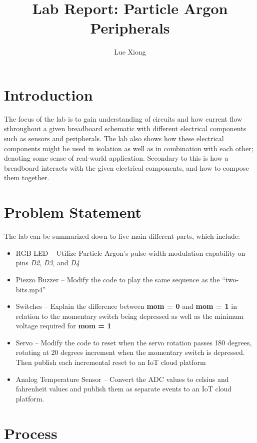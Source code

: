 \documentclass{article}
\title{Lab Report: Particle Argon Peripherals}
\author{Lue Xiong}
\begin{document}
\maketitle
\newpage
\obeylines

\section{Introduction}
The focus of the lab is to gain understanding of circuits and how current flow sthroughout a given breadboard schematic with different electrical components such as sensors and peripherals. The lab also shows how these electrical components might be used in isolation as well as in combination with each other; denoting some sense of real-world application. Secondary to this is how a breadboard interacts with the given electrical components, and how to compose them together.

\section{Problem Statement}
The lab can be summarized down to five main different parts, which include:

\begin{itemize}
\item RGB LED -- Utilize Particle Argon's pulse-width modulation capability on pins \textit{D2}, \textit{D3}, and \textit{D4}
\item Piezzo Buzzer -- Modify the code to play the same sequence as the “two-bits.mp4”
\item Switches -- Explain the difference between \textbf{mom = 0} and \textbf{mom = 1} in relation to the momentary switch being depressed as well as the minimum voltage required for \textbf{mom = 1}
\item Servo -- Modify the code to reset when the servo rotation passes 180 degrees, rotating at 20 degrees increment when the momentary switch is depressed. Then publish each incremental reset to an IoT cloud platform
\item Analog Temperature Sensor -- Convert the ADC values to celsius and fahrenheit values and publish them as separate events to an IoT cloud platform.
\end{itemize}

\section{Process}
\end{document}
